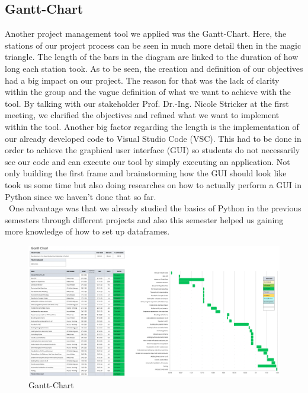 \subsection{Gantt-Chart}
Another project management tool we applied was the Gantt-Chart. Here, the stations of our project process can be seen in much more detail then in the magic triangle. The length of the bars in the diagram are linked to the duration of how long each station took. As to be seen, the creation and definition of our objectives had a big impact on our project. The reason for that was the lack of clarity within the group and the vague definition of what we want to achieve with the tool. By talking with our stakeholder Prof. Dr.-Ing. Nicole Stricker at the first meeting, we clarified the objectives and refined what we want to implement within the tool. Another big factor regarding the length is the implementation of our already developed code to Visual Studio Code (VSC). This had to be done in order to achieve the graphical user interface (GUI) so students do not necessarily see our code and can execute our tool by simply executing an application. Not only building the first frame and brainstorming how the GUI should look like took us some time but also doing researches on how to actually perform a GUI in Python since we haven't done that so far. \\ One advantage was that we already studied the basics of Python in the previous semesters through different projects and also this semester helped us gaining more knowledge of how to set up dataframes. 
\begin{figure}[H]
\includegraphics[width=\linewidth]{Abbildungen/Gantt_Chart.png}
\vspace{-0.7cm}
\caption{Gantt-Chart}
\label{fig:Gantt_Chart}
\end{figure}
\vspace{-1cm}
